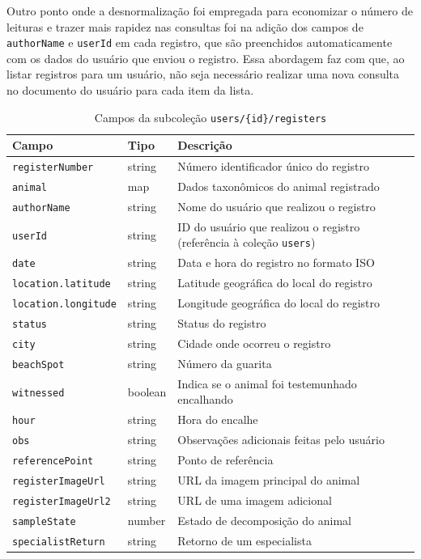 Outro ponto onde a desnormalização foi empregada para economizar o número de leituras e trazer mais rapidez nas consultas foi na adição dos campos de \texttt{authorName} e \texttt{userId} em cada registro, que são preenchidos automaticamente com os dados do usuário que enviou o registro. Essa abordagem faz com que, ao listar registros para um usuário, não seja necessário realizar uma nova consulta no documento do usuário para cada item da lista.

\begin{table}[H]
    \centering
    \caption{Campos da subcoleção \texttt{users/\{id\}/registers}}
    \label{tab:subcolecao-registers}
    \begin{tabular}{|p{4cm}|p{2cm}|p{7cm}|}
        \hline
        \textbf{Campo} & \textbf{Tipo} & \textbf{Descrição} \\ \hline
        \texttt{registerNumber} & string & Número identificador único do registro \\ \hline
        \texttt{animal} & map & Dados taxonômicos do animal registrado \\ \hline
        \texttt{authorName} & string & Nome do usuário que realizou o registro \\ \hline
        \texttt{userId} & string & ID do usuário que realizou o registro (referência à coleção \texttt{users}) \\ \hline
        \texttt{date} & string & Data e hora do registro no formato ISO \\ \hline
        \texttt{location.latitude} & string & Latitude geográfica do local do registro \\ \hline
        \texttt{location.longitude} & string & Longitude geográfica do local do registro \\ \hline
        \texttt{status} & string & Status do registro \\ \hline
        \texttt{city} & string & Cidade onde ocorreu o registro \\ \hline
        \texttt{beachSpot} & string & Número da guarita \\ \hline
        \texttt{witnessed} & boolean & Indica se o animal foi testemunhado encalhando \\ \hline
        \texttt{hour} & string & Hora do encalhe \\ \hline
        \texttt{obs} & string & Observações adicionais feitas pelo usuário \\ \hline
        \texttt{referencePoint} & string & Ponto de referência \\ \hline
        \texttt{registerImageUrl} & string & URL da imagem principal do animal \\ \hline
        \texttt{registerImageUrl2} & string & URL de uma imagem adicional \\ \hline
        \texttt{sampleState} & number & Estado de decomposição do animal \\ \hline
        \texttt{specialistReturn} & string & Retorno de um especialista \\ \hline
    \end{tabular}
\end{table}

